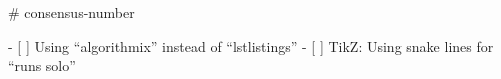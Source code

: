 # consensus-number

- [ ] Using ``algorithmix'' instead of ``lstlistings''
- [ ] TikZ: Using snake lines for ``runs solo''

